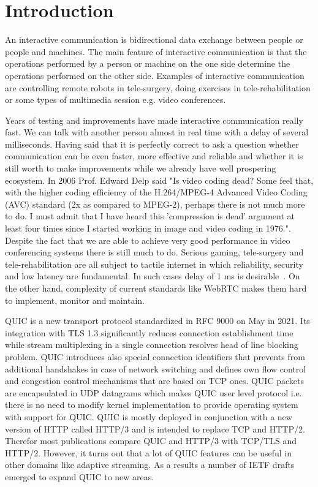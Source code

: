 \section{Introduction}
\label{sec:introduction}

An interactive communication is bidirectional data exchange between people or people and machines.
The main feature of interactive communication is that the operations performed by a person or machine on the one side determine the operations performed on the other side.
Examples of interactive communication are controlling remote robots in tele-surgery, doing exercises in tele-rehabilitation or some types of multimedia session e.g. video conferences.

Years of testing and improvements have made interactive communication really fast.
We can talk with another person almost in real time with a delay of several milliseconds.
Having said that it is perfectly correct to ask a question whether communication can be even faster, more effective and reliable and whether it is still worth to make improvements while we already have well prospering ecosystem.
In 2006 Prof. Edward Delp said "Is video coding dead? Some feel that, with the higher coding efficiency of the H.264/MPEG-4 Advanced Video Coding (AVC) standard (2x as compared to MPEG-2), perhaps there is not much more to do. I must admit that I have heard this 'compression is dead' argument at least four times since I started working in image and video coding in 1976."\cite{4015574}.
Despite the fact that we are able to achieve very good performance in video conferencing systems there is still much to do.
Serious gaming, tele-surgery and tele-rehabilitation are all subject to tactile internet in which reliability, security and low latency are fundamental.
In such cases delay of 1 ms is desirable~\cite{the-tactile-internet}.
On the other hand, complexity of current standards like WebRTC makes them hard to implement, monitor and maintain.


QUIC is a new transport protocol standardized in RFC 9000 on May in 2021.
Its integration with TLS 1.3 significantly reduces connection establishment time while stream multiplexing in a single connection resolves head of line blocking problem.
QUIC introduces also special connection identifiers that prevents from additional handshakes in case of network switching and defines own flow control and congestion control mechanisms that are based on TCP ones.
QUIC packets are encapsulated in UDP datagrams which makes QUIC user level protocol i.e. there is no need to modify kernel implementation to provide operating system with support for QUIC.
QUIC is mostly deployed in conjunction with a new version of HTTP called HTTP/3 and is intended to replace TCP and HTTP/2.
Therefor most publications compare QUIC and HTTP/3 with TCP/TLS and HTTP/2.
However, it turns out that a lot of QUIC features can be useful in other domains like adaptive streaming.
As a results a number of IETF drafts emerged to expand QUIC to new areas.

